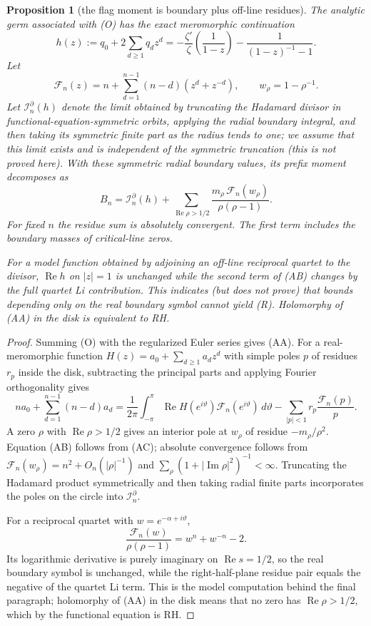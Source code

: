\documentclass[11pt]{amsart}
\newtheorem{proposition}[theorem]{Proposition}
\theoremstyle{definition}
\theoremstyle{remark}
\theoremstyle{definition}
\renewcommand{\Re}{\operatorname{Re}}
\renewcommand{\Im}{\operatorname{Im}}
\begin{document}
\begin{proposition}[the flag moment is boundary plus off-line residues]
\label{prop:a1-flag-residues}
The analytic germ associated with (O) has the exact meromorphic continuation
\[
 h(z):=q_0+2\sum_{d\ge1}q_dz^d
 =-\frac{\zeta'}{\zeta}\!\left(\frac1{1-z}\right)
  -\frac1{(1-z)^{-1}-1}.                                    \tag{AA}
\]
Let
\[
 \mathcal F_n(z)=n+\sum_{d=1}^{n-1}(n-d)(z^d+z^{-d}),
 \qquad w_\rho=1-\rho^{-1}.
\]
Let $\mathcal I_n^\partial(h)$ denote the limit obtained by truncating the
Hadamard divisor in functional-equation-symmetric orbits, applying the
radial boundary integral, and then taking its symmetric finite part as the
radius tends to one; we assume that this limit exists and is independent
of the symmetric truncation (this is not proved here).  With these symmetric radial boundary values, its
prefix moment decomposes as
\[
 \boxed{\quad
 B_n=\mathcal I_n^\partial(h)
 +\sum_{\Re\rho>1/2}
   \frac{m_\rho\,\mathcal F_n(w_\rho)}{\rho(\rho-1)}.
 \quad}                                                       \tag{AB}
\]
For fixed $n$ the residue sum is absolutely convergent.  The first term
includes the boundary masses of critical-line zeros.

For a model function obtained by adjoining an off-line reciprocal quartet
to the divisor, $\Re h$ on $|z|=1$ is unchanged while the second term of
(AB) changes by the full quartet Li contribution.  This indicates (but does
not prove) that bounds depending only on the real boundary symbol cannot
yield (R).  Holomorphy of (AA) in the disk is equivalent to RH.
\end{proposition}

\begin{proof}
Summing (O) with the regularized Euler series gives (AA).  For a
real-meromorphic function $H(z)=a_0+\sum_{d\ge1}a_dz^d$ with simple poles
$p$ of residues $r_p$ inside the disk, subtracting the principal parts and
applying Fourier orthogonality gives
\[
 na_0+\sum_{d=1}^{n-1}(n-d)a_d
 =\frac1{2\pi}\int_{-\pi}^{\pi}
       \Re H(e^{i\vartheta})\mathcal F_n(e^{i\vartheta})\,d\vartheta
  -\sum_{|p|<1}r_p\frac{\mathcal F_n(p)}p.                    \tag{AC}
\]
A zero $\rho$ with $\Re\rho>1/2$ gives an interior pole at $w_\rho$ of
residue $-m_\rho/\rho^2$.  Equation (AB) follows from (AC); absolute
convergence follows from $\mathcal F_n(w_\rho)=n^2+O_n(|\rho|^{-1})$ and
$\sum_\rho(1+|\Im\rho|^2)^{-1}<\infty$.  Truncating the Hadamard product
symmetrically and then taking radial finite parts incorporates the poles on
the circle into $\mathcal I_n^\partial$.

For a reciprocal quartet with $w=e^{-\alpha+i\vartheta}$,
\[
 \frac{\mathcal F_n(w)}{\rho(\rho-1)}=w^n+w^{-n}-2.
\]
Its logarithmic derivative is purely imaginary on $\Re s=1/2$, so the real
boundary symbol is unchanged, while the right-half-plane residue pair equals
the negative of the quartet Li term.  This is the model computation behind
the final paragraph; holomorphy of (AA) in the disk means that no zero has
$\Re\rho>1/2$, which by the functional equation is RH.
\end{proof}
\end{document}
